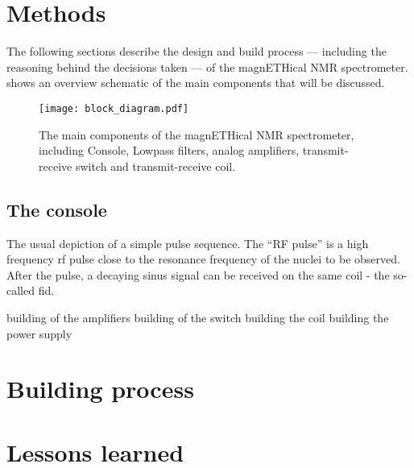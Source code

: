 
\chapter{Methods}

The following sections describe the design and build process --- including the reasoning behind the decisions taken --- of the magnETHical NMR spectrometer.  shows an overview schematic of the main components that will be discussed.

\begin{figure}[hbt]
  \centering
  \texttt{[image: block\_diagram.pdf]}
  \caption{ The main components of the magnETHical NMR spectrometer, including Console, Lowpass filters, analog amplifiers, transmit-receive switch and transmit-receive coil.}
\end{figure}

\section{The console}
\begin{marginfigure}
  \centering
  
  \caption{ The usual depiction of a simple pulse sequence. The \enquote{RF pulse} is a high frequency \acrshort{rf} pulse close to the resonance frequency of the nuclei to be observed. After the pulse, a decaying sinus signal can be received on the same coil -  the so-called \acrfull{fid}.}
\end{marginfigure}


building of the amplifiers
building of the switch
building the coil
building the power supply

\chapter{Building process}

\chapter{Lessons learned}
